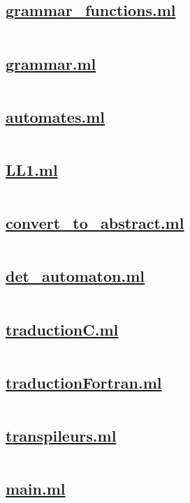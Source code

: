 \subsection{\url{grammar_functions.ml}}
\inputminted[]{ocaml}{../../src/grammar_functions.ml}
\pagebreak
\subsection{\url{grammar.ml}}
\inputminted[]{ocaml}{../../src/grammar.ml}
\pagebreak
\subsection{\url{automates.ml}}
\inputminted[]{ocaml}{../../src/automates.ml}
\pagebreak
\subsection{\url{LL1.ml}}
\inputminted[]{ocaml}{../../src/LL1.ml}
\pagebreak
\subsection{\url{convert_to_abstract.ml}}
\inputminted[]{ocaml}{../../src/convert_to_abstract.ml}
\pagebreak
\subsection{\url{det_automaton.ml}}
\inputminted[]{ocaml}{../../src/det_automaton.ml}
\pagebreak
\subsection{\url{traductionC.ml}}
\inputminted[]{ocaml}{../../src/traductionC.ml}
\pagebreak
\subsection{\url{traductionFortran.ml}}
\inputminted[]{ocaml}{../../src/traductionFortran.ml}
\pagebreak
\subsection{\url{transpileurs.ml}}
\inputminted[]{ocaml}{../../src/transpileurs.ml}
\pagebreak
\subsection{\url{main.ml}}
\inputminted[]{ocaml}{../../src/main.ml}

